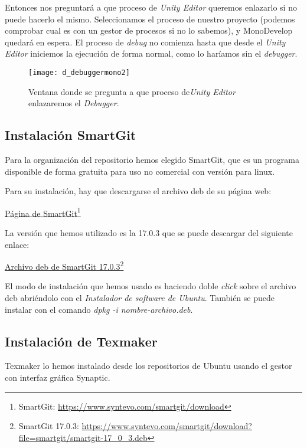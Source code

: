 Entonces nos preguntará a que proceso de \textit{Unity Editor} queremos enlazarlo si no puede hacerlo el mismo. Seleccionamos el proceso de nuestro proyecto (podemos comprobar cual es con un gestor de procesos si no lo sabemos), y MonoDevelop quedará en espera. El proceso de \textit{debug} no comienza hasta que desde el \textit{Unity Editor} iniciemos la ejecución de forma normal, como lo haríamos sin el \textit{debugger}.

\begin{figure}[htpb]
    \centering
    \texttt{[image: d\_debuggermono2]}
    \caption[Enlace del\textit{Debugger} con \textit{Unity Editor} de MonoDevelop]{Ventana donde se pregunta a que proceso de\textit{Unity Editor} enlazaremos el \textit{Debugger}.}
    \label{fig:debuggermono2}
\end{figure}

\subsection{Instalación SmartGit}

Para la organización del repositorio hemos elegido SmartGit, que es un programa disponible de forma gratuita para uso no comercial con versión para linux.

Para su instalación, hay que descargarse el archivo deb de su página web:

\href{https://www.syntevo.com/smartgit/download}{Página de SmartGit}\footnote{SmartGit: \url{https://www.syntevo.com/smartgit/download}}

La versión que hemos utilizado es la 17.0.3 que se puede descargar del siguiente enlace:

\href{https://www.syntevo.com/smartgit/download?file=smartgit/smartgit-17_0_3.deb}{Archivo deb de SmartGit 17.0.3}\footnote{SmartGit 17.0.3: \url{https://www.syntevo.com/smartgit/download?file=smartgit/smartgit-17_0_3.deb}}

El modo de instalación que hemos usado es haciendo doble \textit{click} sobre el archivo deb abriéndolo con el \textit{Instalador de software de Ubuntu}. También se puede instalar con el comando \textit{dpkg -i nombre-archivo.deb}.

\subsection{Instalación de Texmaker}
Texmaker lo hemos instalado desde los repositorios de Ubuntu usando el gestor con interfaz gráfica Synaptic.

